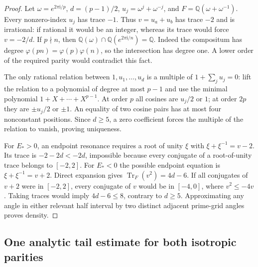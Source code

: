 \documentclass[11pt]{article}
\numberwithin{equation}{section}
\theoremstyle{definition}
\newcommand{\ii}{\mathrm i}
\begin{document}
\begin{proof}
Let $\omega=e^{2\pi\ii/p}$, $d=(p-1)/2$,
$u_j=\omega^j+\omega^{-j}$, and
$F=\mathbb Q(\omega+\omega^{-1})$. Every nonzero-index $u_j$ has
trace $-1$. Thus $v=u_a+u_b$ has trace $-2$ and is irrational:
if rational it would be an integer, whereas its trace would force
$v=-2/d$. If $p\nmid n$, then
$\mathbb Q(\omega)\cap\mathbb Q(e^{2\pi\ii/n})=\mathbb Q$.
Indeed the compositum has degree
$\varphi(pn)=\varphi(p)\varphi(n)$, so the intersection has degree one.
A lower order of the required parity would contradict this fact.

The only rational relation between $1,u_1,\ldots,u_d$ is a multiple of
$1+\sum_j u_j=0$: lift the relation to a polynomial of degree at most
$p-1$ and use the minimal polynomial $1+X+\cdots+X^{p-1}$.
At order $p$ all cosines are $u_j/2$ or $1$; at order $2p$ they are
$\pm u_j/2$ or $\pm1$. An equality of two cosine pairs has at most four
nonconstant positions. Since $d\ge5$, a zero coefficient forces the
multiple of the relation to vanish, proving uniqueness.

For $E_*>0$, an endpoint resonance requires a root of unity $\xi$ with
$\xi+\xi^{-1}=v-2$. Its trace is $-2-2d<-2d$, impossible because
every conjugate of a root-of-unity trace belongs to $[-2,2]$.
For $E_*<0$ the possible endpoint equation is
$\xi+\xi^{-1}=v+2$. Direct expansion gives
$\operatorname{Tr}_F(v^2)=4d-6$. If all conjugates of $v+2$ were in
$[-2,2]$, every conjugate of $v$ would be in $[-4,0]$, where
$v^2\le-4v$. Taking traces would imply $4d-6\le8$, contrary to
$d\ge5$. Approximating any angle in either relevant half interval by
two distinct adjacent prime-grid angles proves density.
\end{proof}

\subsection{One analytic tail estimate for both isotropic parities}
\label{sec:iso-shared-tail}
\end{document}
